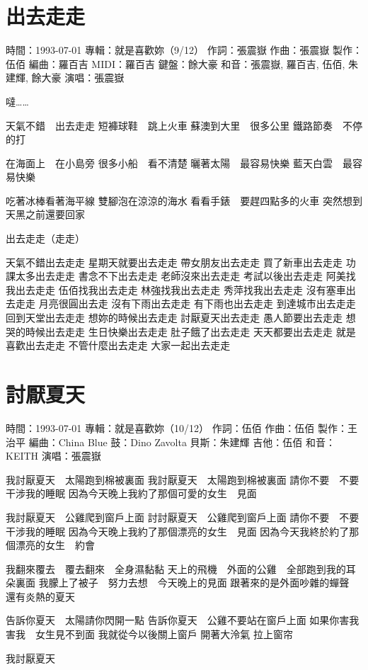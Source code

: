 \documentclass[UTF8,a4paper,oneside,twocolumn,12pt]{ctexbook}
\newcommand{\infopair}[2]{\textbullet #1：#2}
\newcommand{\zc}[1][伍佰]{\infopair{作詞}{#1}}
\newcommand{\zq}[1][伍佰]{\infopair{作曲}{#1}}
\newcommand{\bq}[1][伍佰]{\infopair{編曲}{#1}}
\newcommand{\zj}[1]{\infopair{專輯}{#1}}
\newcommand{\zz}[1]{\infopair{製作}{#1}}
\newcommand{\sj}[1]{\infopair{時間}{#1}}
\newenvironment{info}{\begin{flushleft}\kaishu
	}
	{\end{flushleft}\normalsize\yahei\par}
\newenvironment{lyric}{
	}
{}
\begin{document}
\section{出去走走}
\begin{info}
	\sj{1993-07-01}
	\zj{就是喜歡妳（9/12）}
	\zc[張震嶽]
	\zq[張震嶽]
	\zz{伍佰}
	\bq[羅百吉]
	\infopair{MIDI}{羅百吉}
	\infopair{鍵盤}{餘大豪}
	\infopair{和音}{張震嶽, 羅百吉, 伍佰, 朱建輝, 餘大豪}
	\infopair{演唱}{張震嶽}
\end{info}
\begin{lyric}
	噠……

	天氣不錯　出去走走
	短褲球鞋　跳上火車
	蘇澳到大里　很多公里
	鐵路節奏　不停的打

	在海面上　在小島旁
	很多小船　看不清楚
	曬著太陽　最容易快樂
	藍天白雲　最容易快樂

	吃著冰棒看著海平線
	雙腳泡在涼涼的海水
	看看手錶　要趕四點多的火車
	突然想到天黑之前還要回家

	出去走走（走走）

	天氣不錯出去走走 星期天就要出去走走
	帶女朋友出去走走 買了新車出去走走
	功課太多出去走走 書念不下出去走走
	老師沒來出去走走 考試以後出去走走
	阿美找我出去走走 伍佰找我出去走走
	林強找我出去走走 秀萍找我出去走走
	沒有塞車出去走走 月亮很圓出去走
	沒有下雨出去走走 有下雨也出去走走
	到達城市出去走走 回到天堂出去走走
	想妳的時候出去走走 討厭夏天出去走走
	愚人節要出去走走 想哭的時候出去走走
	生日快樂出去走走 肚子餓了出去走走
	天天都要出去走走 就是喜歡出去走走
	不管什麼出去走走 大家一起出去走走
\end{lyric}

\section{討厭夏天}
\begin{info}
	\sj{1993-07-01}
	\zj{就是喜歡妳（10/12）}
	\zc
	\zq
	\zz{王治平}
	\bq[China Blue]
	\infopair{鼓}{Dino Zavolta}
	\infopair{貝斯}{朱建輝}
	\infopair{吉他}{伍佰}
	\infopair{和音}{KEITH}
	\infopair{演唱}{張震嶽}
\end{info}
\begin{lyric}
	我討厭夏天　太陽跑到棉被裏面
	我討厭夏天　太陽跑到棉被裏面
	請你不要　不要　干涉我的睡眠
	因為今天晚上我約了那個可愛的女生　見面

	我討厭夏天　公雞爬到窗戶上面
	討討厭夏天　公雞爬到窗戶上面
	請你不要　不要　干涉我的睡眠
	因為今天晚上我約了那個漂亮的女生　見面
	因為今天我終於約了那個漂亮的女生　約會

	我翻來覆去　覆去翻來　全身濕黏黏
	天上的飛機　外面的公雞　全部跑到我的耳朵裏面
	我朦上了被子　努力去想　今天晚上的見面
	跟著來的是外面吵雜的蟬聲　還有炎熱的夏天

	告訴你夏天　太陽請你閃開一點
	告訴你夏天　公雞不要站在窗戶上面
	如果你害我　害我　女生見不到面
	我就從今以後關上窗戶
	開著大泠氣
	拉上窗帘

	我討厭夏天
\end{lyric}
\end{document}
